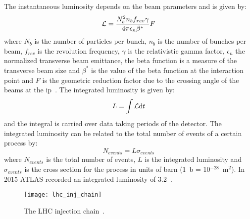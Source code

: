 The instantaneous luminosity depends on the beam parameters and is given by:
\begin{equation}
  \label{eq:54}
  \mathcal{L} = \frac{N^2_b n_b f_{rev} \gamma}{4 \pi \epsilon_n \beta^*} F
\end{equation}
where $N_b$ is the number of particles per bunch, $n_b$ is the number of bunches
per beam, $f_{rev}$ is the revolution frequency, $\gamma$ is the relativistic
gamma factor, $\epsilon_n$ the normalized transverse beam emittance, the beta
function is a measure of the transverse beam size and $\beta^*$ is the value of
the beta function at the interaction point and $F$ is the geometric reduction
factor due to the crossing angle of the beams at the \gls{ip}~\cite{LHC}. The
integrated luminosity is given by:
\begin{equation}
  \label{eq:55}
  L = \int \mathcal{L} \mathrm{d} t
\end{equation}
and the integral is carried over data taking periods of the detector. The
integrated luminosity can be related to the total number of events of a certain
process by:
\begin{equation}
  \label{eq:56}
  N_{events} = L \sigma_{events}
\end{equation}
where $N_{events}$ is the total number of events, $L$ is the integrated
luminosity and $\sigma_{events}$ is the cross section for the process in units
of barn (1~b = 10$^{-28}$~m$^2$). In 2015 ATLAS recorded an integrated
luminosity of 3.2~\ifb.

\begin{figure}[!h]
  \centering
    \texttt{[image: lhc\_inj\_chain]}
    \caption{The LHC injection chain~\cite{LHCFAQ}.}
    \label{fig:lhc_inj_chain}
\end{figure}
